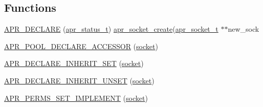 \subsection*{Functions}
\begin{DoxyCompactItemize}
\item 
\hyperlink{group__apr__network__io_gaebf0d76ea5cbea96a7d6929dc7169750}{A\+P\+R\+\_\+\+D\+E\+C\+L\+A\+RE} (\hyperlink{group__apr__errno_gaa5105fa83cc322f09382292db8b47593}{apr\+\_\+status\+\_\+t}) \hyperlink{unix_2sockets_8c_ad975e4f99f233d8156a9e8e1a153199d}{apr\+\_\+socket\+\_\+create}(\hyperlink{structapr__socket__t}{apr\+\_\+socket\+\_\+t} $\ast$$\ast$new\+\_\+sock
\item 
\hyperlink{group__apr__network__io_gab6f56c2b55bde77d91ce4d7f0a9b7454}{A\+P\+R\+\_\+\+P\+O\+O\+L\+\_\+\+D\+E\+C\+L\+A\+R\+E\+\_\+\+A\+C\+C\+E\+S\+S\+OR} (\hyperlink{apr__dbg__win32__handles_8h_aa4c7260d71388442407454f891a12db5}{socket})
\item 
\hyperlink{group__apr__network__io_gaf60d2e3feb2dec7ea0bfbd3ba95a9dea}{A\+P\+R\+\_\+\+D\+E\+C\+L\+A\+R\+E\+\_\+\+I\+N\+H\+E\+R\+I\+T\+\_\+\+S\+ET} (\hyperlink{apr__dbg__win32__handles_8h_aa4c7260d71388442407454f891a12db5}{socket})
\item 
\hyperlink{group__apr__network__io_ga0dec0319399cb788c51de7159dd338c0}{A\+P\+R\+\_\+\+D\+E\+C\+L\+A\+R\+E\+\_\+\+I\+N\+H\+E\+R\+I\+T\+\_\+\+U\+N\+S\+ET} (\hyperlink{apr__dbg__win32__handles_8h_aa4c7260d71388442407454f891a12db5}{socket})
\item 
\hyperlink{group__apr__network__io_ga9fc01ffaed8412193d2744f1fb632d88}{A\+P\+R\+\_\+\+P\+E\+R\+M\+S\+\_\+\+S\+E\+T\+\_\+\+I\+M\+P\+L\+E\+M\+E\+NT} (\hyperlink{apr__dbg__win32__handles_8h_aa4c7260d71388442407454f891a12db5}{socket})
\end{DoxyCompactItemize}
